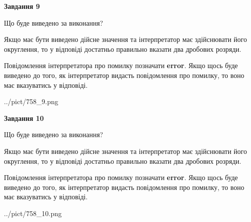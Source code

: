 \documentclass[12pt, ukrainian]{article}
\begin{document}
{\begin {Large}
{\begin {center}\textbf{Завдання 9}\end {center}}\par
Що буде виведено за виконання? \par

Якщо має бути виведено дійсне значення та інтерпретатор має здійснювати його округлення, 
то у відповіді достатньо правильно вказати два дробових розряди.

Повідомлення інтерпретатора про помилку позначати \textbf{error}.
Якщо щось буде виведено до того, як інтерпретатор видасть повідомлення про помилку, 
то воно має вказуватись у відповіді. \par

\begin{center}
	{../pict/758_9.png}
\end{center}
\newpage

{\begin {center}\textbf{Завдання 10}\end {center}}\par
Що буде виведено за виконання? \par

Якщо має бути виведено дійсне значення та інтерпретатор має здійснювати його округлення, 
то у відповіді достатньо правильно вказати два дробових розряди.

Повідомлення інтерпретатора про помилку позначати \textbf{error}.
Якщо щось буде виведено до того, як інтерпретатор видасть повідомлення про помилку, 
то воно має вказуватись у відповіді. \par

\begin{center}
	{../pict/758_10.png}
\end{center}
\newpage

\end {Large}}
\end{document}
